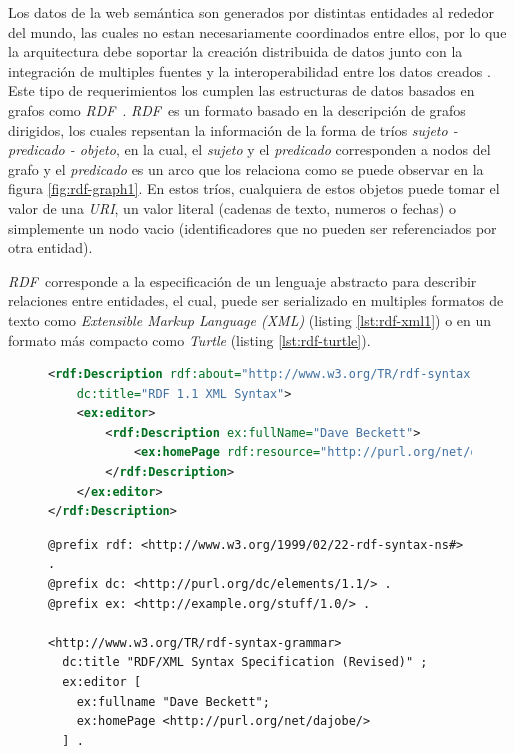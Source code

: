 \documentclass[conference,compsoc]{IEEEtran}
\newcommand{\rdf}{\textit{RDF}\ }
\begin{document}
Los datos de la web semántica son generados por distintas entidades al rededor del mundo, las cuales no estan necesariamente
coordinados entre ellos, por lo que la arquitectura debe soportar la creación distribuida de datos junto con la integración
de multiples fuentes y la interoperabilidad entre los datos creados \cite{bizer2011linked}. Este tipo de requerimientos los
cumplen las estructuras de datos basados en grafos como \rdf. \rdf es un formato basado en la descripción de grafos dirigidos,
los cuales repsentan la información de la forma de tríos \textit{sujeto - predicado - objeto}, en la cual, el \textit{sujeto} y el
\textit{predicado} corresponden a nodos del grafo y el \textit{predicado} es un arco que los relaciona como se puede observar
en la figura \ref{fig:rdf-graph1}. En estos tríos, cualquiera de estos objetos puede tomar el valor de una \textit{URI},
un valor literal (cadenas de texto, numeros o fechas) o simplemente un nodo vacio (identificadores que no pueden ser
referenciados por otra entidad).

\rdf corresponde a la especificación de un lenguaje abstracto para describir relaciones entre entidades, el cual, puede
ser serializado en multiples formatos de texto como \textit{Extensible Markup Language (XML)} \cite{beckett2004rdf} (listing \ref{lst:rdf-xml1})
o en un formato más compacto como \textit{Turtle} \cite{beckett2014rdf} (listing \ref{lst:rdf-turtle}).

\begin{figure}
    \begin{lstlisting}[language=xml, captionpos=b, caption=Descripción de un documento en \textit{RDF/XML}, label=lst:rdf-xml1, basicstyle=\ttfamily, frame=single]
<rdf:Description rdf:about="http://www.w3.org/TR/rdf-syntax-grammar"
    dc:title="RDF 1.1 XML Syntax">
    <ex:editor>
        <rdf:Description ex:fullName="Dave Beckett">
            <ex:homePage rdf:resource="http://purl.org/net/dajobe/"/>
        </rdf:Description>
    </ex:editor>
</rdf:Description>
    \end{lstlisting}
\end{figure}

\begin{figure}
    \begin{lstlisting}[captionpos=b, caption=Descripción de un documento en \textit{RDF/Turtle}, label=lst:rdf-turtle, basicstyle=\ttfamily, frame=single]
@prefix rdf: <http://www.w3.org/1999/02/22-rdf-syntax-ns#> .
@prefix dc: <http://purl.org/dc/elements/1.1/> .
@prefix ex: <http://example.org/stuff/1.0/> .

<http://www.w3.org/TR/rdf-syntax-grammar>
  dc:title "RDF/XML Syntax Specification (Revised)" ;
  ex:editor [
    ex:fullname "Dave Beckett";
    ex:homePage <http://purl.org/net/dajobe/>
  ] .
    \end{lstlisting}
\end{figure}
\end{document}
